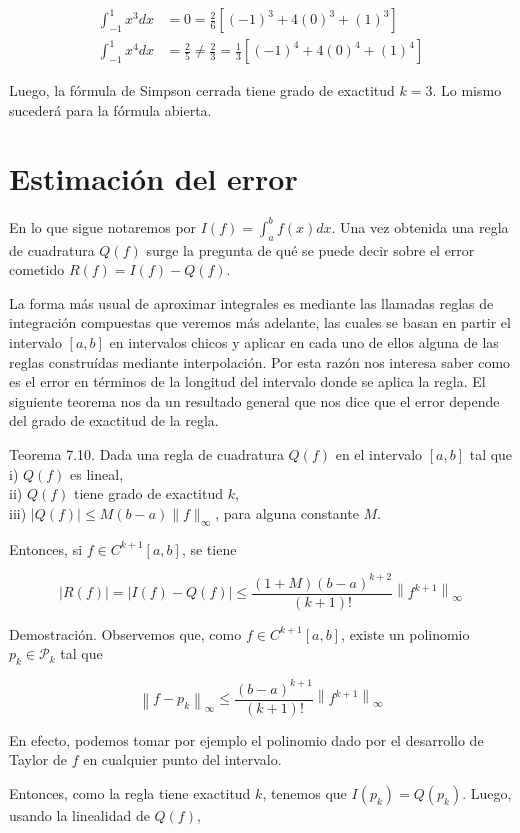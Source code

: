 \documentclass[10pt]{book}
\begin{document}
$$
\begin{aligned}
\int_{-1}^{1} x^{3} d x & =0=\frac{2}{6}\left[(-1)^{3}+4(0)^{3}+(1)^{3}\right] \\
\int_{-1}^{1} x^{4} d x & =\frac{2}{5} \neq \frac{2}{3}=\frac{1}{3}\left[(-1)^{4}+4(0)^{4}+(1)^{4}\right]
\end{aligned}
$$

Luego, la fórmula de Simpson cerrada tiene grado de exactitud $k=3$. Lo mismo sucederá para la fórmula abierta.

\section{Estimación del error}
En lo que sigue notaremos por $I(f)=\int_{a}^{b} f(x) d x$. Una vez obtenida una regla de cuadratura $Q(f)$ surge la pregunta de qué se puede decir sobre el error cometido $R(f)=I(f)-Q(f)$.

La forma más usual de aproximar integrales es mediante las llamadas reglas de integración compuestas que veremos más adelante, las cuales se basan en partir el intervalo $[a, b]$ en intervalos chicos y aplicar en cada uno de ellos alguna de las reglas construídas mediante interpolación. Por esta razón nos interesa saber como es el error en términos de la longitud del intervalo donde se aplica la regla. El siguiente teorema nos da un resultado general que nos dice que el error depende del grado de exactitud de la regla.

Teorema 7.10. Dada una regla de cuadratura $Q(f)$ en el intervalo $[a, b]$ tal que\\
i) $Q(f)$ es lineal,\\
ii) $Q(f)$ tiene grado de exactitud $k$,\\
iii) $|Q(f)| \leq M(b-a)\|f\|_{\infty}$, para alguna constante $M$.

Entonces, si $f \in C^{k+1}[a, b]$, se tiene

$$
|R(f)|=|I(f)-Q(f)| \leq \frac{(1+M)(b-a)^{k+2}}{(k+1)!}\left\|f^{k+1}\right\|_{\infty}
$$

Demostración. Observemos que, como $f \in C^{k+1}[a, b]$, existe un polinomio $p_{k} \in \mathcal{P}_{k}$ tal que

$$
\left\|f-p_{k}\right\|_{\infty} \leq \frac{(b-a)^{k+1}}{(k+1)!}\left\|f^{k+1}\right\|_{\infty}
$$

En efecto, podemos tomar por ejemplo el polinomio dado por el desarrollo de Taylor de $f$ en cualquier punto del intervalo.

Entonces, como la regla tiene exactitud $k$, tenemos que $I\left(p_{k}\right)=Q\left(p_{k}\right)$. Luego, usando la linealidad de $Q(f)$,
\end{document}
